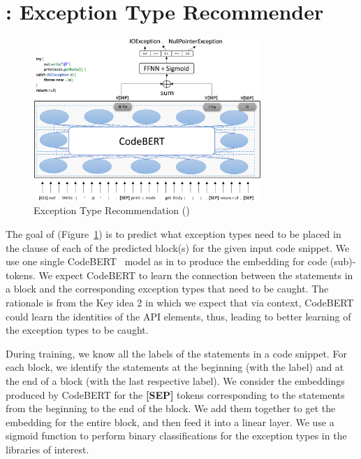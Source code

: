 \section{{\xtype}: Exception Type Recommender}
\label{sec:xtype}

\begin{figure}[t]
\begin{center}
\includegraphics[width=3.4in]{xtype-4.png}
\vspace{-20pt}
\caption{Exception Type Recommendation ({\xtype})}
\label{fig:xtype}
\end{center}
\end{figure}

The goal of {\xtype} (Figure~\ref{fig:xtype}) is to predict what
exception types need to be placed in the  clause of each
of the predicted  block(s) for the given input code
snippet. We use one single CodeBERT~\cite{codebert-emnlp20} model as
in {\xblock} to produce the embedding for code (sub)-tokens.
%
We expect CodeBERT to learn the connection between the statements in a
 block and the corresponding exception types that need
to be caught. The rationale is from the Key idea 2 in which we expect
that via context, CodeBERT could learn the identities of the API
elements, thus, leading to better learning of the exception types to
be caught.

During training, we know all the labels of the statements in a code
snippet. For each  block, we identify the statements
at the beginning (with the  label) and at the end of a
 block (with the last respective  label).
We consider the embeddings produced by CodeBERT for the {\bf [SEP]}
tokens corresponding to the statements from the beginning to the end
of the  block. We add them together to get the
embedding for the entire  block, and then feed it into
a linear layer. We use a sigmoid function to perform binary
classifications for the exception types in the libraries of interest.

